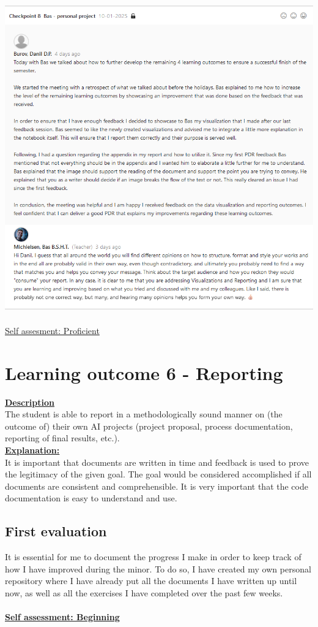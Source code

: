 \documentclass{article}
\begin{document}
\includegraphics[width=\textwidth,keepaspectratio]{images/Feedback_Bas_4.png}\\\\
\underline{Self assesment: Proficient}

\section{Learning outcome 6 - Reporting}
\underline{\textbf{Description}}\\
The student is able to report in a methodologically sound manner on (the outcome of) 
their own AI projects (project proposal, process documentation, reporting of final results, etc.).\\
\underline{\textbf{Explanation:}}\\
It is important that documents are written in time and feedback is used to prove the legitimacy of the given goal. The goal would be considered 
accomplished if all documents are consistent and comprehensible. It is very important that the code documentation is easy
to understand and use.

\subsection{First evaluation}
It is essential for me to document the progress I make in order to keep track of how I have improved during the minor. To do so, 
I have created my own personal repository where I have already put all the documents I have written up until now, as well as all the exercises 
I have completed over the past few weeks.\\\\
\underline{\textbf{Self assessment: Beginning}}
\end{document}
